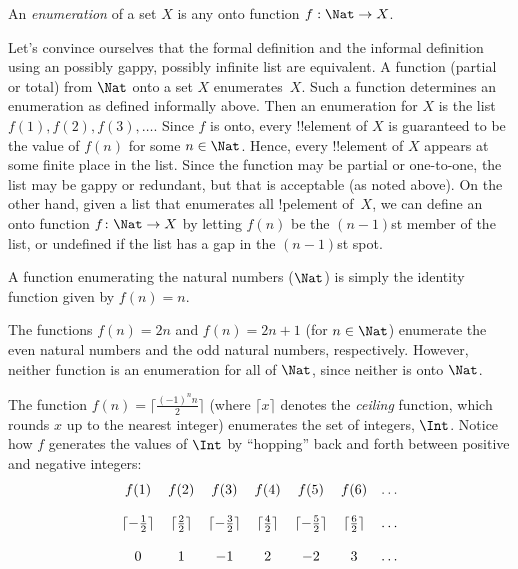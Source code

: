 \documentclass[../../include/open-logic-section]{subfiles}
\begin{document}
\begin{defn}
An \emph{enumeration} of a set $X$ is any onto function $f: 
\Nat \rightarrow X$.
\end{defn}

\begin{explain}
Let's convince ourselves that the formal definition and the informal
definition using an possibly gappy, possibly infinite list are
equivalent. A function (partial or total) from $\Nat$ onto a set $X$
enumerates~$X$. Such a function determines an enumeration as defined
informally above. Then an enumeration for $X$ is the list $f(1), f(2),
f(3), \dots$. Since $f$ is onto, every !!{element} of $X$ is
guaranteed to be the value of $f(n)$ for some $n \in \Nat$.  Hence,
every !!{element} of $X$ appears at some finite place in the
list. Since the function may be partial or one-to-one, the list may be
gappy or redundant, but that is acceptable (as noted above). On the
other hand, given a list that enumerates all !p{element} of~$X$, we
can define an onto function $f\colon \Nat \to X$ by letting $f(n)$ be
the $(n-1)$st member of the list, or undefined if the list has a gap
in the $(n-1)$st spot.
\end{explain}

\begin{ex}
A function enumerating the natural numbers ($\Nat$) is 
simply the identity function given by $f(n) = n$.
\end{ex}

\begin{ex}
The functions $f(n) = 2n$ and $f(n) = 2n+1$ (for $n \in \Nat$) 
enumerate the even natural numbers and the odd natural numbers, 
respectively. However, neither function is an enumeration for all of 
$\Nat$, since neither is onto $\Nat$.
\end{ex}

\begin{ex}
The function $f(n) = \lceil \frac{(-1)^n n}{2}\rceil$ (where $\lceil x
\rceil$ denotes the \emph{ceiling} function, which rounds $x$ up to
the nearest integer) enumerates the set of integers, $\Int$. Notice
how $f$ generates the values of $\Int$ by ``hopping'' back and forth
between positive and negative integers: 
\[
\begin{array}{c c c c c c c}
f(1) & f(2) & f(3) & f(4) & f(5) & f(6) & \dots \\ \\
\lceil - \tfrac{1}{2}\rceil & \lceil \tfrac{2}{2} \rceil & \lceil - 
\tfrac{3}{2} \rceil & \lceil \tfrac{4}{2} \rceil  & \lceil -\tfrac{5}{2} 
\rceil & \lceil \tfrac{6}{2} \rceil & \dots \\ \\
0 & 1 & -1 & 2 & -2 & 3 & \dots
\end{array}
\]
\end{ex}
\end{document}
